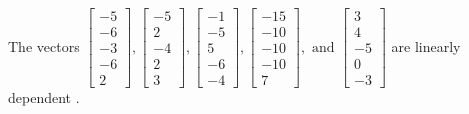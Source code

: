 \begin{exercise}
\begin{exerciseStatement}
  \end{exerciseStatement}
  \begin{exerciseAnswer}
   The vectors \(\left[\begin{array}{r}
-5 \\
-6 \\
-3 \\
-6 \\
2
\end{array}\right] , \left[\begin{array}{r}
-5 \\
2 \\
-4 \\
2 \\
3
\end{array}\right] , \left[\begin{array}{r}
-1 \\
-5 \\
5 \\
-6 \\
-4
\end{array}\right] , \left[\begin{array}{r}
-15 \\
-10 \\
-10 \\
-10 \\
7
\end{array}\right] , \text{ and } \left[\begin{array}{r}
3 \\
4 \\
-5 \\
0 \\
-3
\end{array}\right]\) are 
  	 linearly dependent  .
  


  \end{exerciseAnswer}
\end{exercise}